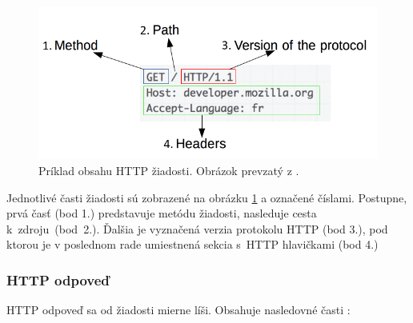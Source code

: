 \begin{figure}[htb!]
\begin{center}
    \includegraphics[scale=0.6]{obrazky-figures/http_request.png}
    \caption{Príklad obsahu HTTP žiadosti. Obrázok prevzatý z \cite{mdn-docs-http-overview}.}
    \label{fig:http-request}
\end{center}
\end{figure}

Jednotlivé časti žiadosti sú zobrazené na obrázku \ref{fig:http-request} a označené číslami. Postupne, prvá časť (bod 1.) predstavuje metódu žiadosti, nasleduje cesta \mbox{k zdroju (bod 2.)}. 
Ďalšia je vyznačená verzia protokolu HTTP (bod 3.), pod ktorou je v poslednom rade umiestnená sekcia \mbox{s HTTP} hlavičkami (bod 4.) 


\subsubsection{HTTP odpoveď}

\noindent HTTP odpoveď sa od žiadosti mierne líši. Obsahuje nasledovné časti \cite{rfc7230, mdn-docs-http-overview}:

